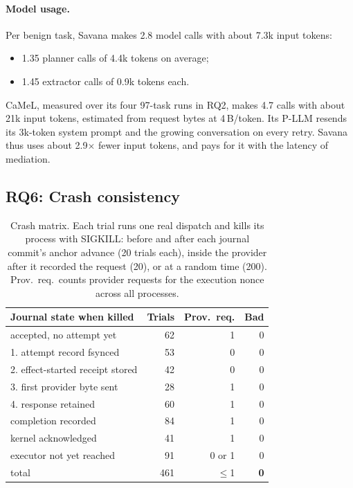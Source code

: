 \documentclass[letterpaper,twocolumn,10pt]{article}
\newcommand{\sys}{Savana}
\begin{document}
\paragraph{Model usage.} Per benign task, \sys{} makes 2.8 model calls with
about 7.3k input tokens:
\begin{itemize}
\item 1.35 planner calls of 4.4k tokens on average;
\item 1.45 extractor calls of 0.9k tokens each.
\end{itemize}
CaMeL, measured over its four 97-task runs in RQ2, makes 4.7 calls with
about 21k input tokens, estimated from request bytes at 4\,B/token. Its P-LLM resends its 3k-token system prompt and the
growing conversation on every retry. \sys{} thus uses about 2.9$\times$
fewer input tokens, and pays for it with the latency of mediation.

\subsection{RQ6: Crash consistency}
\label{sec:eval-crash}

\begin{table}[t]
\centering\footnotesize
\begin{tabular}{@{}lrrr@{}}
\toprule
Journal state when killed & Trials & Prov.\ req. & Bad\\
\midrule
accepted, no attempt yet           & 62 & 1 & 0\\
1. attempt record fsynced          & 53 & 0 & 0\\
2. effect-started receipt stored   & 42 & 0 & 0\\
3. first provider byte sent        & 28 & 1 & 0\\
4. response retained               & 60 & 1 & 0\\
completion recorded                & 84 & 1 & 0\\
kernel acknowledged                & 41 & 1 & 0\\
executor not yet reached           & 91 & 0 or 1 & 0\\
\midrule
total                              & 461 & $\le$1 & \textbf{0}\\
\bottomrule
\end{tabular}
\caption{Crash matrix. Each trial runs one real dispatch and kills its
process with SIGKILL: before and after each journal commit's anchor
advance (20 trials each), inside the provider after it recorded the
request (20), or at a random time (200). Prov.\ req.\ counts provider
requests for the execution nonce across all processes.}
\label{tab:crash}
\end{table}
\end{document}
